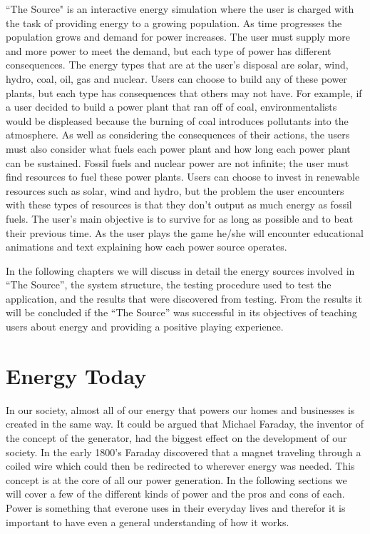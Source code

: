 \documentclass[msc,oneside]{ubcthesis}%
\begin{document}
\medskip
  ``The Source" is an interactive energy simulation where the user is charged with the task of providing energy to a growing population. As time progresses the population grows and demand for power increases. The user must supply more and more power to meet the demand, but each type of power has different consequences. The energy types that are at the user's disposal are solar, wind, hydro, coal, oil, gas and nuclear. Users can choose to build any of these power plants, but each type has consequences that others may not have. For 
example, if a user decided to build a power plant that ran off of coal, environmentalists would be 
displeased because the burning of coal introduces pollutants into the atmosphere. As well as considering 
the consequences of their actions, the users must also consider what fuels each power plant and how long 
each power plant can be sustained. Fossil fuels and nuclear power are not infinite; the user must find 
resources to fuel these power plants. Users can choose to invest in renewable resources such as solar, wind 
and hydro, but the problem the user encounters with these types of resources is that they don't output as 
much energy as fossil fuels. The user's main objective is to survive for as long as possible and to beat 
their previous time. As the user plays the game he/she will encounter educational animations and text explaining how each power source operates.

\medskip
In the following chapters we will discuss in detail the energy sources involved in ``The Source'', the system structure, the testing procedure used to test the application, and the results that were discovered from testing. From the results it will be concluded if the ``The Source'' was successful in its objectives of teaching users about energy and providing a positive playing experience.


\chapter{Energy Today}
  In our society, almost all of our energy that powers our homes and businesses is created in the same way. 
It could be argued that Michael Faraday, the inventor of the concept of the generator, had the biggest 
effect on the development of our society. In the early 1800's Faraday discovered that a magnet traveling 
through a coiled wire which could then be redirected 
to wherever energy was needed. This concept is at the core of all our power generation. In the following sections we will cover a few of the different kinds of power and the pros and cons of each. Power is something that everone uses in their everyday lives and therefor it is important to have even a general understanding of how it works. 
\end{document}
